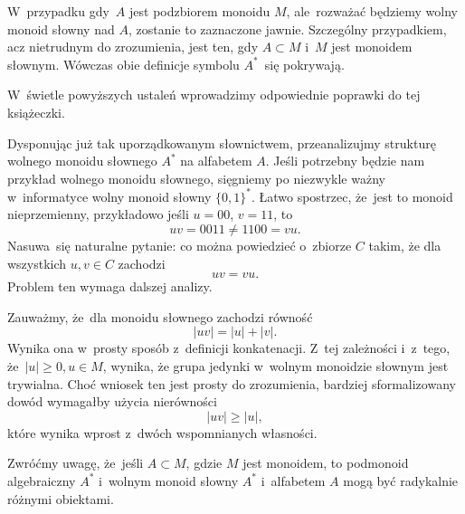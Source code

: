 \documentclass[a4paper,11pt]{article}
\begin{document}
W~przypadku gdy~$A$ jest podzbiorem monoidu $M$, ale~rozważać będziemy
wolny monoid słowny nad $A$, zostanie to zaznaczone jawnie. Szczególny
przypadkiem, acz nietrudnym do zrozumienia, jest ten, gdy $A \subset M$ i~$M$
jest monoidem słownym. Wówczas obie definicje symbolu $A^{ * }$~się
pokrywają.

W~świetle powyższych ustaleń wprowadzimy odpowiednie poprawki do tej
książeczki.

\vspace{\spaceFour}





\start {} Dysponując już tak uporządkowanym słownictwem,
przeanalizujmy strukturę wolnego monoidu słownego $A^{ * }$ na
alfabetem $A$. Jeśli potrzebny będzie nam przykład wolnego monoidu
słownego, sięgniemy po niezwykle ważny w~informatyce wolny monoid
słowny $\{ 0, 1 \}^{ * }$. Łatwo spostrzec, że~jest to monoid
nieprzemienny, przykładowo jeśli $u = 00$, $v = 11$, to
\begin{equation}
  \label{eq:Forys-Forys-08}
  u v = 0011 \neq 1100 = vu.
\end{equation}
Nasuwa~się naturalne pytanie: co można powiedzieć o~zbiorze $C$ takim,
że dla wszystkich $u, v \in C$ zachodzi
\begin{equation}
  \label{eq:Forys-Forys-09}
  uv = vu.
\end{equation}
Problem ten wymaga dalszej analizy.

Zauważmy, że~dla monoidu słownego zachodzi równość
\begin{equation}
  \label{eq:Forys-Forys-10}
  | u v | = | u | + | v |.
\end{equation}
Wynika ona w~prosty sposób z~definicji konkatenacji. Z~tej zależności
i~z~tego, że~$| u | \geq 0, u \in M$, wynika, że grupa jedynki
w~wolnym monoidzie słownym jest trywialna. Choć wniosek ten jest
prosty do zrozumienia, bardziej sformalizowany dowód wymagałby użycia
nierówności
\begin{equation}
  \label{eq:Forys-Forys-11}
  | u v | \geq | u |,
\end{equation}
które wynika wprost z~dwóch wspomnianych własności.

\vspace{\spaceFour}





 Zwróćmy uwagę, że~jeśli $A \subset M$, gdzie $M$ jest
monoidem, to podmonoid algebraiczny $A^{ * }$ i~wolnym monoid słowny
$A^{ * }$ i~alfabetem $A$ mogą być radykalnie różnymi obiektami.
\end{document}
